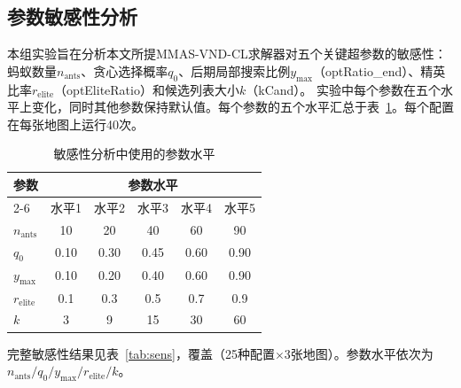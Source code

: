 \documentclass[lettersize,journal]{IEEEtran}
\begin{document}
\subsection{参数敏感性分析}
\label{subsec:exp_sens}
本组实验旨在分析本文所提MMAS-VND-CL求解器对五个关键超参数的敏感性：蚂蚁数量$n_{\mathrm{ants}}$、贪心选择概率$q_0$、后期局部搜索比例$y_{\max}$（optRatio\_end）、精英比率$r_{\mathrm{elite}}$（optEliteRatio）和候选列表大小$k$（kCand）。
实验中每个参数在五个水平上变化，同时其他参数保持默认值。每个参数的五个水平汇总于表~\ref{tab:levels}。每个配置在每张地图上运行40次。
\begin{table}[!t]
\caption{敏感性分析中使用的参数水平}
\label{tab:levels}
\centering
\begin{tabular}{lccccc}
\toprule
\multirow{2}{*}{参数} & \multicolumn{5}{c}{参数水平} \\
\cmidrule(lr){2-6}
 & 水平1 & 水平2 & 水平3 & 水平4 & 水平5 \\
\midrule
$n_{\mathrm{ants}}$ & 10 & 20 & 40 & 60 & 90 \\
$q_0$ & 0.10 & 0.30 & 0.45 & 0.60 & 0.90 \\
$y_{\max}$ & 0.10 & 0.20 & 0.40 & 0.60 & 0.90 \\
$r_{\mathrm{elite}}$ & 0.1 & 0.3 & 0.5 & 0.7 & 0.9 \\
$k$ & 3 & 9 & 15 & 30 & 60 \\
\bottomrule
\end{tabular}
\end{table}
完整敏感性结果见表~\ref{tab:sens}，覆盖（25种配置$\times$3张地图）。参数水平依次为$n_{\mathrm{ants}}/q_0/y_{\max}/r_{\mathrm{elite}}/k$。
\end{document}
